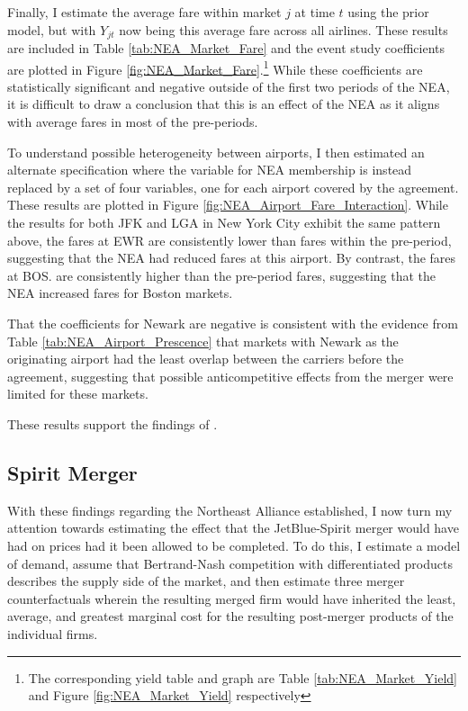 \documentclass{article}
\let\Oldsubsection\subsection
\renewcommand{\subsection}{\FloatBarrier\Oldsubsection}
\begin{document}
	Finally, I estimate the average fare within market $j$ at time $t$ using the prior model, but with $Y_{jt}$ now being this average fare across all airlines.  These results are included in Table \ref{tab:NEA_Market_Fare} and the event study coefficients are plotted in Figure \ref{fig:NEA_Market_Fare}.\footnote{The corresponding yield table and graph are Table \ref{tab:NEA_Market_Yield} and Figure \ref{fig:NEA_Market_Yield} respectively} While these coefficients are statistically significant and negative outside of the first two periods of the NEA, it is difficult to draw a conclusion that this is an effect of the NEA as it aligns with average fares in most of the pre-periods. 
	
	To understand possible heterogeneity between airports, I then estimated an alternate specification where the variable for NEA membership is instead replaced by a set of four variables, one for each airport covered by the agreement. These results are plotted in Figure \ref{fig:NEA_Airport_Fare_Interaction}. While the results for both JFK and LGA in New York City exhibit the same pattern above, the fares at EWR are consistently lower than fares within the pre-period, suggesting that the NEA had reduced fares at this airport. By contrast, the fares at BOS. are consistently higher than the pre-period fares, suggesting that the NEA increased fares for Boston markets.
	
	 That the coefficients for Newark are negative is consistent with the evidence from Table \ref{tab:NEA_Airport_Prescence} that markets with Newark as the originating airport had the least overlap between the carriers before the agreement, suggesting that possible anticompetitive effects from the merger were limited for these markets. 
	
		These results support the findings of \citet{zou_assessing_2023}. 
	

	
	\subsection{Spirit Merger}
	With these findings regarding the Northeast Alliance established, I now turn my attention towards estimating the effect that the JetBlue-Spirit merger would have had on prices had it been allowed to be completed. To do this, I estimate a model of demand, assume that Bertrand-Nash competition with differentiated products describes the supply side of the market, and then estimate three merger counterfactuals wherein the resulting merged firm would have inherited the least, average, and greatest marginal cost for the resulting post-merger products of the individual firms. 
	
\end{document}
